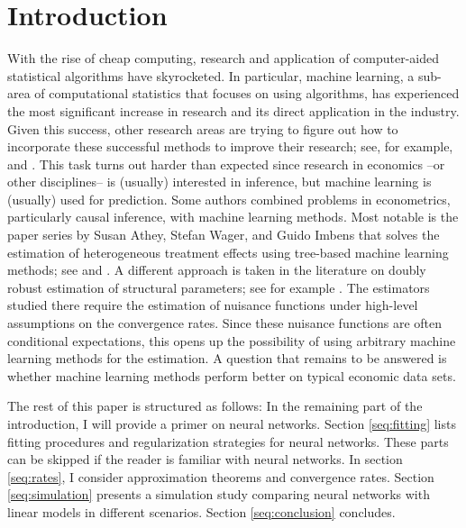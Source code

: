 \section{Introduction}
\label{seq:introduction}

With the rise of cheap computing, research and application of computer-aided statistical
algorithms have skyrocketed. In particular, machine learning, a sub-area of
computational statistics that focuses on using algorithms, has experienced the most
significant increase in research and its direct application in the industry. Given this
success, other research areas are trying to figure out how to incorporate these
successful methods to improve their research; see, for example, \cite{Varian.2014} and
\cite{Athey.2019}. This task turns out harder than expected since research in economics
--or other disciplines-- is (usually) interested in inference, but machine learning is
(usually) used for prediction. Some authors combined problems in econometrics,
particularly causal inference, with machine learning methods. Most notable is the paper
series by Susan Athey, Stefan Wager, and Guido Imbens that solves the estimation of
heterogeneous treatment effects using tree-based machine learning methods; see
\cite{Athey.2016} and \cite{Athey.2018}. A different approach is taken in the literature
on doubly robust estimation of structural parameters; see for example
\cite{Chernozhukov.2018}. The estimators studied there require the estimation of
nuisance functions under high-level assumptions on the convergence rates. Since these
nuisance functions are often conditional expectations, this opens up the possibility of
using arbitrary machine learning methods for the estimation. A question that remains to
be answered is whether machine learning methods perform better on typical economic
data sets.

The rest of this paper is structured as follows: In the remaining part of the
introduction, I will provide a primer on neural networks. Section \ref{seq:fitting}
lists fitting procedures and regularization strategies for neural networks. These parts
can be skipped if the reader is familiar with neural networks. In section
\ref{seq:rates}, I consider approximation theorems and convergence rates. Section
\ref{seq:simulation} presents a simulation study comparing neural networks with linear
models in different scenarios. Section \ref{seq:conclusion} concludes.


